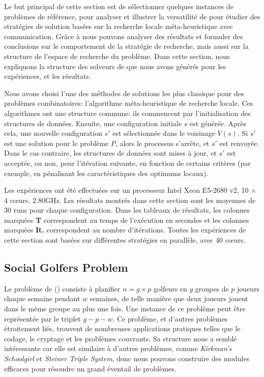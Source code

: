 
Le but principal de cette section est de sélectionner quelques instances de problèmes de référence, pour analyser et illustrer la versatilité de \posl{} pour étudier des stratégies de solution basées sur la recherche locale méta-heuristique avec communication. Grâce à \posl{} nous pouvons analyser des résultats et formuler des conclusions sur le comportement de la stratégie de recherche, mais aussi sur la structure de l'espace de recherche du problème. Dans cette section, nous expliquons la structure des  solveurs de \posl{} que nous avons générés pour les expériences, et les résultats.

Nous avons choisi l'une des méthodes de solutions les plus classique pour des problèmes combinatoires: l'algorithme méta-heuristique de recherche locale. Ces algorithmes ont une structure commune: ils commencent par l'initialisation des structures de données. Ensuite, une configuration initiale $s$ est générée. Après cela, une nouvelle configuration $s'$ est sélectionnée dans le voisinage $V \left(s \right) $. Si $s'$ est une solution pour le problème $P$, alors le processus s'arrête, et $s'$ est renvoyée. Dans le cas contraire, les structures de données sont mises à jour, et $s'$ est acceptée, ou non, pour l'itération suivante, en fonction de certains critères (par exemple, en pénalisant les caractéristiques des optimums locaux).

Les expériences ont été effectuées sur un processeur Intel \R{} Xeon \TM{} E5-2680 v2, 10 $\times$ 4 c\oe urs, 2.80GHz. Les résultats montrés dans cette section sont les moyennes de 30 runs pour chaque configuration. Dans les tableaux de résultats, les colonnes marquées {\bf T} correspondent au temps de l'exécution en secondes et les colonnes marquées {\bf It.} correspondent au nombre d'itérations. Toutes les expériences de cette section sont basées sur différentes stratégies en parallèle, avec 40 c\oe urs.

\subsection{Social Golfers Problem}

Le problème de \sg{} (\SGP) consiste à planifier $n = g \times p$ golfeurs en $g$ groupes de $p$ joueurs chaque semaine pendant $w$ semaines, de telle manière que deux joueurs jouent dans le même groupe au plus une fois. Une instance de ce problème peut être représentée par le triplet $g-p-w$. Ce problème, et d'autres problèmes étroitement liés, trouvent de nombreuses applications pratiques telles que le codage, le cryptage et les problèmes couvrants. Sa structure nous a semblé intéressante car elle est similaire à d'autres problèmes, comme {\it Kirkman's Schoolgirl} et {\it Steiner Triple System}, donc nous pouvons construire des modules efficaces pour résoudre un grand éventail de problèmes.


